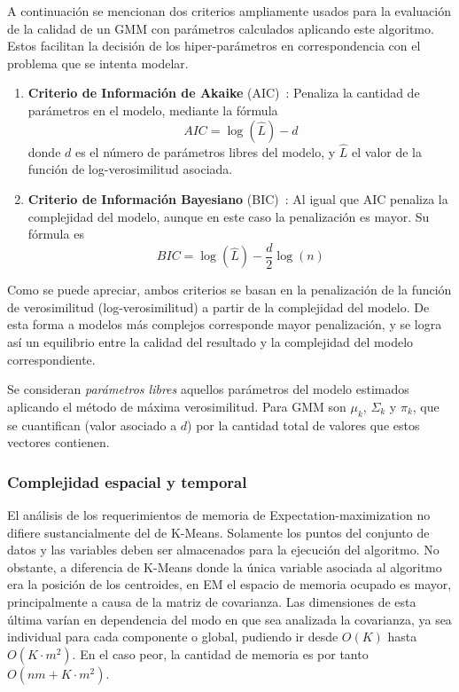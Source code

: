 A continuación se mencionan dos criterios ampliamente usados para la evaluación de la calidad de un GMM con parámetros calculados aplicando este algoritmo.
Estos facilitan la decisión de los hiper-parámetros en correspondencia con el problema que se intenta modelar.

\begin{enumerate}
    \item \textbf{Criterio de Información de Akaike} (AIC)~\cite{Akaike74}:
    Penaliza la cantidad de parámetros en el modelo, mediante la fórmula
    \begin{equation*}
        AIC = \log(\hat{L}) - d
    \end{equation*}
    donde $d$ es el número de parámetros libres del modelo, y $\hat L$ el valor de la función de log-verosimilitud asociada.
    \item \textbf{Criterio de Información Bayesiano} (BIC)~\cite{Schwarz78}: Al igual que AIC penaliza la complejidad del modelo, aunque en este caso la penalización es mayor.
    Su fórmula es
    \begin{equation*}
        BIC = \log(\hat{L}) - \frac{d}{2}\log(n)
    \end{equation*}
\end{enumerate}

Como se puede apreciar, ambos criterios se basan en la penalización de la función de verosimilitud (log-verosimilitud) a partir de la complejidad del modelo.
De esta forma a modelos más complejos corresponde mayor penalización, y se logra así un equilibrio entre la calidad del resultado y la complejidad del modelo correspondiente.

Se consideran \textit{parámetros libres} aquellos parámetros del modelo estimados aplicando el método de máxima verosimilitud.
Para GMM son $\mu_k$, $\Sigma_k$ y $\pi_k$, que se cuantifican (valor asociado a $d$) por la cantidad total de valores que estos vectores contienen.

\subsubsection{Complejidad espacial y temporal}

El análisis de los requerimientos de memoria de Expectation-maximization no difiere sustancialmente del de K-Means.
Solamente los puntos del conjunto de datos y las variables deben ser almacenados para la ejecución del algoritmo.
No obstante, a diferencia de K-Means donde la única variable asociada al algoritmo era la posición de los centroides, en EM el espacio de memoria ocupado es mayor, principalmente a causa de la matriz de covarianza.
Las dimensiones de esta última varían en dependencia del modo en que sea analizada la covarianza, ya sea individual para cada componente o global, pudiendo ir desde $O(K)$ hasta $O(K \cdot m^2)$.
En el caso peor, la cantidad de memoria es por tanto $O(nm + K \cdot m^2)$.

